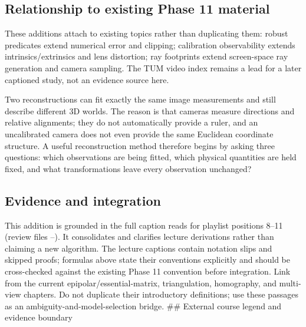 \subsection{Relationship to existing Phase 11 material}\label{02-foundations-ii-ch039-relationship-to-existing-phase-11-material}

\hypertarget{02-foundations-ii-ch039-relationship-to-existing-phase-11-material}{}

These additions attach to existing topics rather than duplicating them: robust predicates extend numerical error and clipping; calibration observability extends intrinsics/extrinsics and lens distortion; ray footprints extend screen-space ray generation and camera sampling. The TUM video index remains a lead for a later captioned study, not an evidence source here.

Two reconstructions can fit exactly the same image measurements and still describe different 3D worlds. The reason is that cameras measure directions and relative alignments; they do not automatically provide a ruler, and an uncalibrated camera does not even provide the same Euclidean coordinate structure. A useful reconstruction method therefore begins by asking three questions: which observations are being fitted, which physical quantities are held fixed, and what transformations leave every observation unchanged?

\subsection{Evidence and integration}\label{02-foundations-ii-ch039-evidence-and-integration}

\hypertarget{02-foundations-ii-ch039-evidence-and-integration}{}

This addition is grounded in the full caption reads for playlist positions 8--11 (review files --). It consolidates and clarifies lecture derivations rather than claiming a new algorithm. The lecture captions contain notation slips and skipped proofs; formulas above state their conventions explicitly and should be cross-checked against the existing Phase 11 convention before integration. Link from the current epipolar/essential-matrix, triangulation, homography, and multi-view chapters. Do not duplicate their introductory definitions; use these passages as an ambiguity-and-model-selection bridge. \#\# External course legend and evidence boundary

